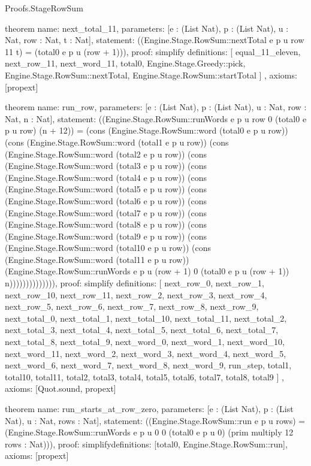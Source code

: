 \begin{lexlean}{Proofs.StageRowSum}
\begin{semanticmodule}
theorem{
  name: next_total_11,
  parameters: [e : (List Nat), p : (List Nat), u : Nat, row : Nat, t : Nat],
  statement: ((Engine.Stage.RowSum::nextTotal e p u row 11 t) = (total0 e p u (row + 1))),
  proof: simplify{
    definitions: [
      equal_11_eleven,
      next_row_11,
      next_word_11,
      total0,
      Engine.Stage.Greedy::pick,
      Engine.Stage.RowSum::nextTotal,
      Engine.Stage.RowSum::startTotal
    ]
  },
  axioms: [propext]
}

theorem{
  name: run_row,
  parameters: [e : (List Nat), p : (List Nat), u : Nat, row : Nat, n : Nat],
  statement: ((Engine.Stage.RowSum::runWords e p u row 0 (total0 e p u row) (n + 12)) = (cons (Engine.Stage.RowSum::word (total0 e p u row)) (cons (Engine.Stage.RowSum::word (total1 e p u row)) (cons (Engine.Stage.RowSum::word (total2 e p u row)) (cons (Engine.Stage.RowSum::word (total3 e p u row)) (cons (Engine.Stage.RowSum::word (total4 e p u row)) (cons (Engine.Stage.RowSum::word (total5 e p u row)) (cons (Engine.Stage.RowSum::word (total6 e p u row)) (cons (Engine.Stage.RowSum::word (total7 e p u row)) (cons (Engine.Stage.RowSum::word (total8 e p u row)) (cons (Engine.Stage.RowSum::word (total9 e p u row)) (cons (Engine.Stage.RowSum::word (total10 e p u row)) (cons (Engine.Stage.RowSum::word (total11 e p u row)) (Engine.Stage.RowSum::runWords e p u (row + 1) 0 (total0 e p u (row + 1)) n)))))))))))))),
  proof: simplify{
    definitions: [
      next_row_0,
      next_row_1,
      next_row_10,
      next_row_11,
      next_row_2,
      next_row_3,
      next_row_4,
      next_row_5,
      next_row_6,
      next_row_7,
      next_row_8,
      next_row_9,
      next_total_0,
      next_total_1,
      next_total_10,
      next_total_11,
      next_total_2,
      next_total_3,
      next_total_4,
      next_total_5,
      next_total_6,
      next_total_7,
      next_total_8,
      next_total_9,
      next_word_0,
      next_word_1,
      next_word_10,
      next_word_11,
      next_word_2,
      next_word_3,
      next_word_4,
      next_word_5,
      next_word_6,
      next_word_7,
      next_word_8,
      next_word_9,
      run_step,
      total1,
      total10,
      total11,
      total2,
      total3,
      total4,
      total5,
      total6,
      total7,
      total8,
      total9
    ]
  },
  axioms: [Quot.sound, propext]
}

theorem{
  name: run_starts_at_row_zero,
  parameters: [e : (List Nat), p : (List Nat), u : Nat, rows : Nat],
  statement: ((Engine.Stage.RowSum::run e p u rows) = (Engine.Stage.RowSum::runWords e p u 0 0 (total0 e p u 0) (prim multiply 12 rows : Nat))),
  proof: simplify{definitions: [total0, Engine.Stage.RowSum::run]},
  axioms: [propext]
}


\end{semanticmodule}
\end{lexlean}
